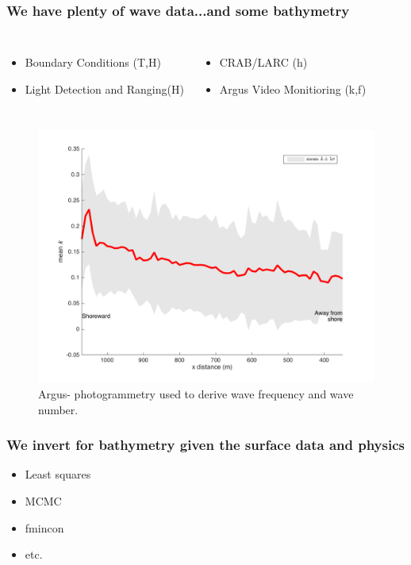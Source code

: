 \documentclass[7pt]{beamer}
\begin{document}
\begin{frame}
\frametitle{We have plenty of wave data...and some bathymetry}
\begin{columns}
\begin{itemize}
\item Boundary Conditions (T,H)
\item Light Detection and Ranging(H)
\end{itemize}
\begin{itemize}
\item CRAB/LARC (h)
\item Argus Video Monitioring (k,f)
\end{itemize}
\end{columns}

\begin{figure}[H]
\centering
\includegraphics[width=.45\linewidth]{img/k1Dmean_std.png}
\caption{Argus- photogrammetry used to derive wave frequency and wave number.}

\end{figure}
\end{frame}


\begin{frame}
 \frametitle{We invert for bathymetry given the surface data and physics}

\begin{itemize}
\item Least squares
\item MCMC
\item fmincon
\item etc.
\end{itemize}


\end{frame}
\end{document}
